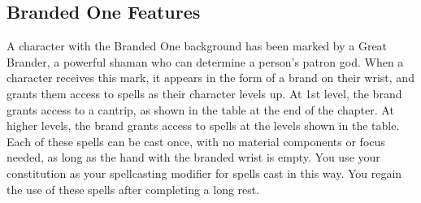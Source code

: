 \subsection{Branded One Features}
A character with the Branded One background has been marked by a Great Brander, a powerful shaman who can determine a person's patron god. When a character receives this mark, it appears in the form of a brand on their wrist, and grants them access to spells as their character levels up. At 1st level, the brand grants access to a cantrip, as shown in the table at the end of the chapter. At higher levels, the brand grants access to spells at the levels shown in the table. Each of these spells can be cast once, with no material components or focus needed, as long as the hand with the branded wrist is empty. You use your constitution as your spellcasting modifier for spells cast in this way. You regain the use of these spells after completing a long rest.

